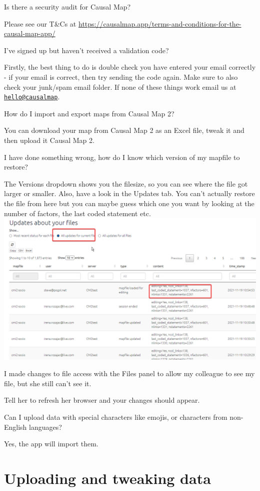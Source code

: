 \documentclass[
]{book}
\begin{document}
Is there a security audit for Causal Map?

Please see our T\&Cs at \url{https://causalmap.app/terms-and-conditions-for-the-causal-map-app/}

I've signed up but haven't received a validation code?

Firstly, the best thing to do is double check you have entered your email correctly - if your email is correct, then try sending the code again. Make sure to also check your junk/spam email folder. If none of these things work email us at \href{mailto:hello@causalmap}{\nolinkurl{hello@causalmap}}.

How do I import and export maps from Causal Map 2?

You can download your map from Causal Map 2 as an Excel file, tweak it and then upload it Causal Map 2.

I have done something wrong, how do I know which version of my mapfile to restore?

The Versions dropdown shows you the filesize, so you can see where the file got larger or smaller. Also, have a look in the Updates tab. You can't actually restore the file from here but you can maybe guess which one you want by looking at the number of factors, the last coded statement etc.
\includegraphics{_assets/image-20211119105900995.png}

I made changes to file access with the Files panel to allow my colleague to see my file, but she still can't see it.

Tell her to refresh her browser and your changes should appear.

Can I upload data with special characters like emojis, or characters from non-English languages?

Yes, the app will import them.

\hypertarget{uploading-and-tweaking-data}{%
\section{Uploading and tweaking data}\label{uploading-and-tweaking-data}}
\end{document}
